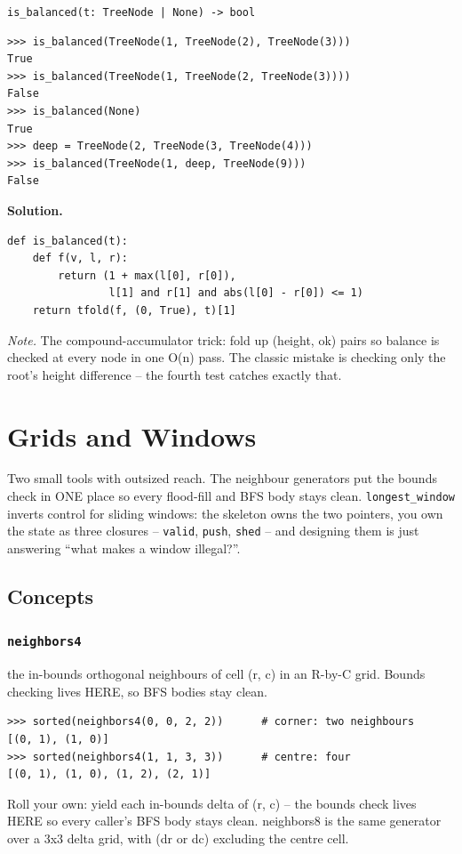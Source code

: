 \documentclass[10pt,letterpaper]{book}
\begin{document}
\noindent\texttt{is\_balanced(t: TreeNode | None) -> bool}
\begin{lstlisting}[style=ex]
>>> is_balanced(TreeNode(1, TreeNode(2), TreeNode(3)))
True
>>> is_balanced(TreeNode(1, TreeNode(2, TreeNode(3))))
False
>>> is_balanced(None)
True
>>> deep = TreeNode(2, TreeNode(3, TreeNode(4)))
>>> is_balanced(TreeNode(1, deep, TreeNode(9)))
False
\end{lstlisting}
\noindent\textbf{Solution.}
\begin{lstlisting}[style=code]
def is_balanced(t):
    def f(v, l, r):
        return (1 + max(l[0], r[0]),
                l[1] and r[1] and abs(l[0] - r[0]) <= 1)
    return tfold(f, (0, True), t)[1]
\end{lstlisting}
\noindent\textit{Note.} The compound-accumulator trick: fold up (height, ok) pairs so balance is checked at every node in one O(n) pass. The classic mistake is checking only the root's height difference -- the fourth test catches exactly that.

\clearpage
\chapter{Grids and Windows}

Two small tools with outsized reach. The neighbour generators put the
bounds check in ONE place so every flood-fill and BFS body stays clean.
\texttt{longest\_window} inverts control for sliding windows: the skeleton
owns the two pointers, you own the state as three closures --
\texttt{valid}, \texttt{push}, \texttt{shed} -- and designing them is just
answering ``what makes a window illegal?''.
\section{Concepts}
\subsection{\texttt{neighbors4}}\label{def:neighbors4}
the in-bounds orthogonal neighbours of cell (r, c) in an R-by-C grid. Bounds checking lives HERE, so BFS bodies stay clean.
\begin{lstlisting}[style=ex]
>>> sorted(neighbors4(0, 0, 2, 2))      # corner: two neighbours
[(0, 1), (1, 0)]
>>> sorted(neighbors4(1, 1, 3, 3))      # centre: four
[(0, 1), (1, 0), (1, 2), (2, 1)]
\end{lstlisting}

Roll your own: yield each in-bounds delta of (r, c) -- the bounds check lives HERE so every caller's BFS body stays clean. neighbors8 is the same generator over a 3x3 delta grid, with (dr or dc) excluding the centre cell.
\end{document}
